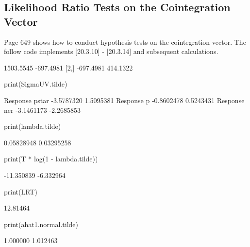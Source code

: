 \documentclass[a4paper]{article}
\begin{document}
\subsection{Likelihood Ratio Tests on the Cointegration Vector}
Page 649 shows how to conduct hypothesis tests on the cointegration vector.  The follow code implements
[20.3.10] - [20.3.14] and subsequent calculations.
\begin{Schunk}
\begin{Soutput}
          [,1]      [,2]
[1,] 1503.5545 -697.4981
[2,] -697.4981  414.1322
\end{Soutput}
\begin{Sinput}
 print(SigmaUV.tilde)
\end{Sinput}
\begin{Soutput}
                     [,1]       [,2]
Response pstar -3.5787320  1.5095381
Response p     -0.8602478  0.5243431
Response ner   -3.1461173 -2.2685853
\end{Soutput}
\begin{Sinput}
 print(lambda.tilde)
\end{Sinput}
\begin{Soutput}
[1] 0.05828948 0.03295258
\end{Soutput}
\begin{Sinput}
 print(T * log(1 - lambda.tilde))
\end{Sinput}
\begin{Soutput}
[1] -11.350839  -6.332964
\end{Soutput}
\begin{Sinput}
 print(LRT)
\end{Sinput}
\begin{Soutput}
[1] 12.81464
\end{Soutput}
\begin{Sinput}
 print(ahat1.normal.tilde)
\end{Sinput}
\begin{Soutput}
[1] 1.000000 1.012463
\end{Soutput}
\end{Schunk}
\end{document}
